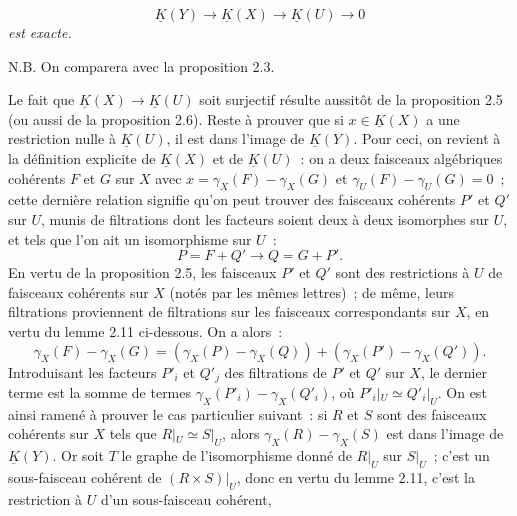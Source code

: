 \begin{equation}\tag{2.30}
 \underline K(Y)\longrightarrow\underline K(X)\longrightarrow\underline K(U)\longrightarrow 0
\end{equation}
\emph{est exacte.}

N.B. On comparera avec la proposition 2.3.

Le fait que $\underline K(X)\longrightarrow\underline K(U)$ soit surjectif résulte aussitôt de la proposition 2.5 (ou aussi de la proposition 2.6). Reste à prouver que si $x\in\underline K(X)$ a une restriction nulle à $\underline K(U)$, il est dans l'image de $\underline K(Y)$. Pour ceci, on revient à la définition explicite de $\underline K(X)$ et de $\underline K(U)$~: on a deux faisceaux algébriques cohérents $F$ et $G$ sur $X$ avec $x=\gamma_X(F)-\gamma_X(G)$ et $\gamma_U(F)-\gamma_U(G)=0$~; cette dernière relation signifie qu'on peut trouver des faisceaux cohérents $P'$ et $Q'$ sur $U$, munis de filtrations dont les facteurs soient deux à deux isomorphes sur $U$, et tels que l'on ait un isomorphisme sur $U$~:
\[
 P=F+Q'\longrightarrow Q=G+P'.
\]
En vertu de la proposition 2.5, les faisceaux $P'$ et $Q'$ sont des restrictions à $U$ de faisceaux cohérents sur $X$ (notés par les mêmes lettres)~; de même, leurs filtrations proviennent de filtrations sur les faisceaux correspondants sur $X$, en vertu du lemme 2.11 ci-dessous. On a alors~:
\[
 \gamma_X(F)-\gamma_X(G)=(\gamma_X(P)-\gamma_X(Q))+(\gamma_X(P')-\gamma_X(Q')).
\]
Introduisant les facteurs $P'_i$ et $Q'_j$ des filtrations de $P'$ et $Q'$ sur $X$, le dernier terme est la somme de termes $\gamma_X(P'_i)-\gamma_X(Q'_i)$, où $P'_i|_U\simeq Q'_i|_U$. On est ainsi ramené à prouver le cas particulier suivant~: si $R$ et $S$ sont des faisceaux cohérents sur $X$ tels que $R|_U\simeq S|_U$, alors $\gamma_X(R)-\gamma_X(S)$ est dans l'image de $\underline K(Y)$. Or soit $T$ le graphe de l'isomorphisme donné de $R|_U$ sur $S|_U$~; c'est un sous-faisceau cohérent de $(R\times S)|_U$, donc en vertu du lemme 2.11, c'est la restriction à $U$ d'un sous-faisceau cohérent, 
